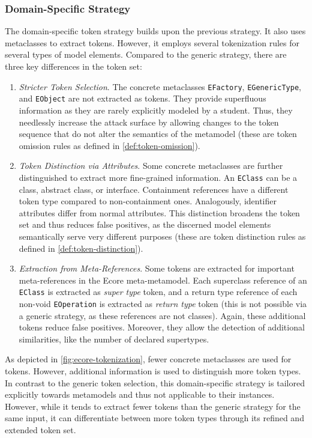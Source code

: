 \subsubsection{Domain-Specific Strategy}
The domain-specific token strategy builds upon the previous strategy. It also uses metaclasses to extract tokens. However, it employs several tokenization rules for several types of model elements.
Compared to the generic strategy, there are three key differences in the token set:
\begin{enumerate}
    \item \textit{Stricter Token Selection}. The concrete metaclasses \texttt{EFactory}, \texttt{EGenericType}, and \texttt{EObject} are not extracted as tokens. They provide superfluous information as they are rarely explicitly modeled by a student. Thus, they needlessly increase the attack surface by allowing changes to the token sequence that do not alter the semantics of the metamodel (these are token omission rules as defined in \autoref{def:token-omission}).
    \item \textit{Token Distinction via Attributes}. Some concrete metaclasses are further distinguished to extract more fine-grained information. An \texttt{EClass} can be a class, abstract class, or interface. Containment references have a different token type compared to non-containment ones. Analogously, identifier attributes differ from normal attributes. This distinction broadens the token set and thus reduces false positives, as the discerned model elements semantically serve very different purposes (these are token distinction rules as defined in \autoref{def:token-distinction}).
    \item \textit{Extraction from Meta-References}. Some tokens are extracted for important meta-references in the Ecore meta-metamodel. Each superclass reference of an \texttt{EClass} is extracted as \textit{super type} token, and a return type reference of each non-void \texttt{EOperation} is extracted as \textit{return type} token (this is not possible via a generic strategy, as these references are not classes).
Again, these additional tokens reduce false positives. Moreover, they allow the detection of additional similarities, like the number of declared supertypes.
\end{enumerate}
%
As depicted in \autoref{fig:ecore-tokenization}, fewer concrete metaclasses are used for tokens. However, additional information is used to distinguish more token types.
In contrast to the generic token selection, this domain-specific strategy is tailored explicitly towards metamodels and thus not applicable to their instances. However, while it tends to extract fewer tokens than the generic strategy for the same input, it can differentiate between more token types through its refined and extended token set.



